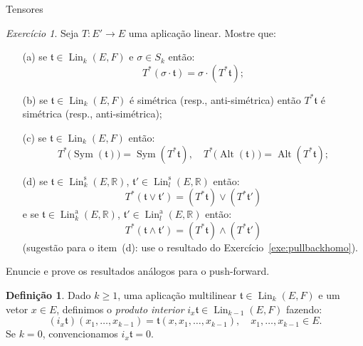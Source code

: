\documentclass[oneside,11pt]{amsart}
\newcommand{\R}{\mathds R}
\DeclareMathOperator{\Lin}{Lin}
\DeclareMathOperator{\Sym}{Sym}
\DeclareMathOperator{\Alt}{Alt}
\theoremstyle{remark}\newtheorem{exercise}{Exercício}[section]
\theoremstyle{plain}\newtheorem{teo}{Teorema}[section]
\theoremstyle{plain}\newtheorem{lem}[teo]{Lema}
\theoremstyle{plain}\newtheorem{prop}[teo]{Proposição}
\theoremstyle{definition}\newtheorem{defin}[teo]{Definição}
\theoremstyle{remark}\newtheorem{rem}[teo]{Observação}
\theoremstyle{definition}\newtheorem{example}[teo]{Exemplo}
\numberwithin{equation}{section}
\begin{document}
\begin{section}{Tensores}
\begin{exercise}\label{exe:sigmapullback}
Seja $T:E'\to E$ uma aplicação linear. Mostre que:
\begin{itemize}
\item[(a)] se $\mathfrak t\in\Lin_k(E,F)$ e $\sigma\in S_k$ então:
\[T^*(\sigma\cdot\mathfrak t)=\sigma\cdot(T^*\mathfrak t);\]
\item[(b)] se $\mathfrak t\in\Lin_k(E,F)$ é simétrica (resp., anti-simétrica) então $T^*\mathfrak t$ é simétrica (resp., anti-simétrica);
\item[(c)] se $\mathfrak t\in\Lin_k(E,F)$ então:
\[T^*\big(\!\Sym(\mathfrak t)\big)=\Sym(T^*\mathfrak t),\quad T^*\big(\!\Alt(\mathfrak t)\big)=\Alt(T^*\mathfrak t);\]
\item[(d)] se $\mathfrak t\in\Lin_k^{\mathrm s}(E,\R)$, $\mathfrak t'\in\Lin_l^{\mathrm s}(E,\R)$ então:
\[T^*(\mathfrak t\vee\mathfrak t')=(T^*\mathfrak t)\vee(T^*\mathfrak t')\]
e se $\mathfrak t\in\Lin_k^{\mathrm a}(E,\R)$, $\mathfrak t'\in\Lin_l^{\mathrm a}(E,\R)$ então:
\[T^*(\mathfrak t\wedge\mathfrak t')=(T^*\mathfrak t)\wedge(T^*\mathfrak t')\]
(sugestão para o item~(d): use o resultado do Exercício~\ref{exe:pullbackhomo}).
\end{itemize}
Enuncie e prove os resultados análogos para o push-forward.
\end{exercise}

\begin{defin}\label{thm:defprodint}
Dado $k\ge1$, uma aplicação multilinear $\mathfrak t\in\Lin_k(E,F)$ e um vetor $x\in E$, definimos o {\em produto interior\/} $i_x\mathfrak t\in\Lin_{k-1}(E,F)$
fazendo:
\[(i_x\mathfrak t)(x_1,\ldots,x_{k-1})=\mathfrak t(x,x_1,\ldots,x_{k-1}),\quad x_1,\ldots,x_{k-1}\in E.\]
Se $k=0$, convencionamos $i_x\mathfrak t=0$.
\end{defin}


\end{section}
\end{document}

